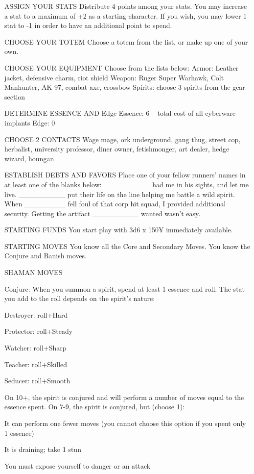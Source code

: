 ASSIGN YOUR STATS
Distribute 4 points among your stats. You may increase a stat to a maximum of +2 as a starting character. If you wish, you may lower 1 stat to -1 in order to have an additional point to spend.

CHOOSE YOUR TOTEM
Choose a totem from the list, or make up one of your own.

CHOOSE YOUR EQUIPMENT
Choose from the lists below:
Armor: Leather jacket, defensive charm, riot shield
Weapon: Ruger Super Warhawk, Colt Manhunter, AK-97, combat axe, crossbow
Spirits: choose 3 spirits from the gear section

DETERMINE ESSENCE AND Edge
Essence: 6 – total cost of all cyberware implants
Edge: 0

CHOOSE 2 CONTACTS
Wage mage, ork underground, gang thug, street cop, herbalist, university professor, diner owner, fetishmonger, art dealer, hedge wizard, houngan

ESTABLISH DEBTS AND FAVORS
Place one of your fellow runners’ names in at least one of the blanks below:
\_\_\_\_\_\_\_\_\_ had me in his sights, and let me live.
\_\_\_\_\_\_\_\_\_ put their life on the line helping me battle a wild spirit.
When \_\_\_\_\_\_\_\_ fell foul of that corp hit squad, I provided additional security.
Getting the artifact \_\_\_\_\_\_\_\_\_ wanted wasn’t easy.

STARTING FUNDS
You start play with 3d6 x 150¥ immediately available.

STARTING MOVES
You know all the Core and Secondary Moves. You know the Conjure and Banish moves.

SHAMAN MOVES

Conjure: When you summon a spirit, spend at least 1 essence and roll. The stat you add to the roll depends on the spirit’s nature:

Destroyer: roll+Hard

Protector: roll+Steady

Watcher: roll+Sharp

Teacher: roll+Skilled

Seducer: roll+Smooth

On 10+, the spirit is conjured and will perform a number of moves equal to the essence spent. On 7-9, the spirit is conjured, but (choose 1):

It can perform one fewer moves (you cannot choose this option if you spent only 1 essence)

It is draining; take 1 stun

You must expose yourself to danger or an attack

